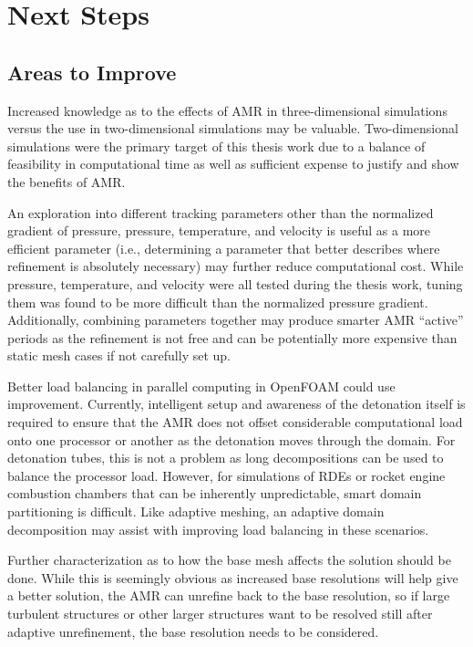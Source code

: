\section{Next Steps}
\subsection{Areas to Improve}
Increased knowledge as to the effects of AMR in three-dimensional simulations versus the use in two-dimensional simulations may be valuable. Two-dimensional simulations were the primary target of this thesis work due to a balance of feasibility in computational time as well as sufficient expense to justify and show the benefits of AMR. 

An exploration into different tracking parameters other than the normalized gradient of pressure, pressure, temperature, and velocity is useful as a more efficient parameter (i.e., determining a parameter that better describes where refinement is absolutely necessary) may further reduce computational cost. While pressure, temperature, and velocity were all tested during the thesis work, tuning them was found to be more difficult than the normalized pressure gradient. Additionally, combining parameters together may produce smarter AMR ``active'' periods as the refinement is not free and can be potentially more expensive than static mesh cases if not carefully set up. 

Better load balancing in parallel computing in OpenFOAM could use improvement. Currently, intelligent setup and awareness of the detonation itself is required to ensure that the AMR does not offset considerable computational load onto one processor or another as the detonation moves through the domain. For detonation tubes, this is not a problem as long decompositions can be used to balance the processor load. However, for simulations of RDEs or rocket engine combustion chambers that can be inherently unpredictable, smart domain partitioning is difficult. Like adaptive meshing, an adaptive domain decomposition may assist with improving load balancing in these scenarios. 

Further characterization as to how the base mesh affects the solution should be done. While this is seemingly obvious as increased base resolutions will help give a better solution, the AMR can unrefine back to the base resolution, so if large turbulent structures or other larger structures want to be resolved still after adaptive unrefinement, the base resolution needs to be considered. 

